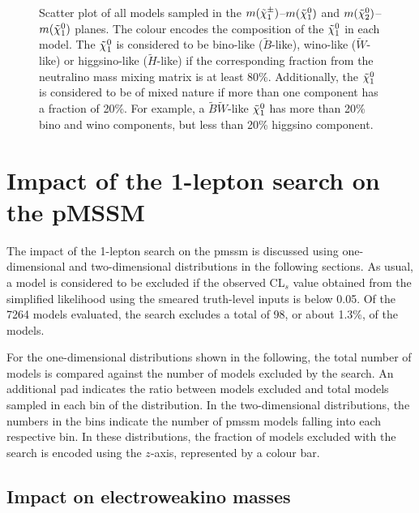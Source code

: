 \begin{figure}
\begin{subfigure}[b]{0.5\linewidth}
		\caption{\label{fig:lsp_types_N2}}
	\end{subfigure}\hfill
	\caption{Scatter plot of all models sampled in the  $m(\tilde{\chi}_1^\pm)$--$m(\tilde{\chi}_1^0)$ and  $m(\tilde{\chi}_2^0)$--$m(\tilde{\chi}_1^0)$ planes. The colour encodes the composition of the $\tilde{\chi}_1^0$ in each model. The $\tilde{\chi}_1^0$ is considered to be bino-like ($\tilde{B}$-like), wino-like ($\tilde{W}$-like) or higgsino-like ($\tilde{H}$-like) if the corresponding fraction from the neutralino mass mixing matrix is at least 80\%. Additionally, the $\tilde{\chi}_1^0$ is considered to be of mixed nature if more than one component has a fraction of 20\%. For example, a $\tilde{B}\tilde{W}$-like $\tilde{\chi}_1^0$ has more than 20\% bino and wino components, but less than 20\% higgsino component.}
	\label{fig:lsp_phenomenology}
\end{figure}

\section{Impact of the 1-lepton search on the pMSSM}

The impact of the 1-lepton search on the \gls{pmssm} is discussed using one-dimensional and two-dimensional distributions in the following sections. As usual, a model is considered to be excluded if the observed CL$_s$ value obtained from the simplified likelihood using the smeared truth-level inputs is below 0.05. Of the 7264 models evaluated, the \onelepton search excludes a total of 98, or about 1.3\%, of the models.

For the one-dimensional distributions shown in the following, the total number of models is compared against the number of models excluded by the \onelepton search. An additional pad indicates the ratio between models excluded and total models sampled in each bin of the distribution. In the two-dimensional distributions, the numbers in the bins indicate the number of \gls{pmssm} models falling into each respective bin. In these distributions, the fraction of models excluded with the \onelepton search is encoded using the $z$-axis, represented by a colour bar.

\subsection{Impact on electroweakino masses}\label{sec:impact_electroweakino_masses}

